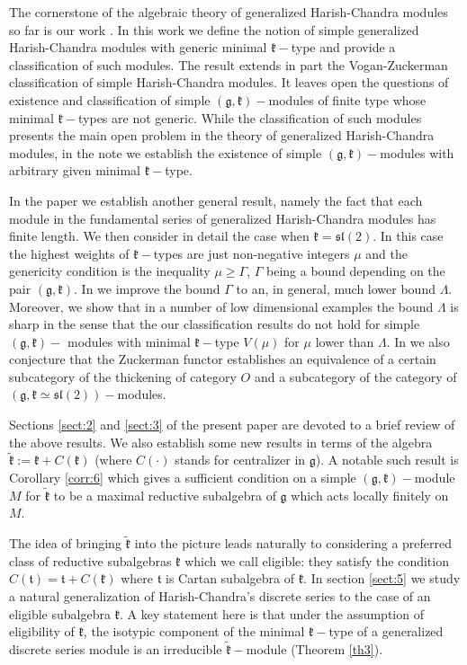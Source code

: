 \documentclass[10pt]{amsart}
\renewcommand{\gg}{\mathfrak{g}}
\newcommand{\kk}{\mathfrak{k}}
\renewcommand{\tt}{\mathfrak{t}}
\renewcommand{\sl}{\mathfrak{sl}}
\begin{document}
The cornerstone of the algebraic theory of generalized Harish-Chandra modules so far is our work \cite{PZ2}. In this work we define the notion of simple generalized Harish-Chandra modules with generic minimal $\kk-$type and provide a classification of such modules. The result extends in part the Vogan-Zuckerman classification of simple Harish-Chandra modules. It leaves open the questions of existence and classification of simple $(\gg,\kk)-$modules of finite type whose minimal $\kk-$types are not generic. While the classification of such modules presents the main open problem in the theory of generalized Harish-Chandra modules, in the note \cite{PZ3} we establish the existence of simple $(\gg,\kk)-$modules with arbitrary given minimal $\kk-$type.

In the paper \cite{PZ5} we establish another general result, namely the fact that each module in the fundamental series of generalized Harish-Chandra modules has finite length. We then consider in detail the case when $\kk=\sl(2)$. In this case the highest weights of $\kk-$types are just non-negative integers $\mu$ and the genericity condition is the inequality $\mu \geq \Gamma$, $\Gamma$ being a bound depending on the pair $(\gg,\kk)$. In \cite{PZ5} we improve the bound $\Gamma$ to an, in general, much lower bound $\Lambda$. Moreover, we show that in a number of low dimensional examples the bound $\Lambda$ is sharp in the sense that the our classification results do not hold for simple $(\gg,\kk)-$ modules with minimal $\kk-$type $V(\mu)$ for $\mu$ lower than $\Lambda$. In \cite{PZ5} we also conjecture that the Zuckerman functor establishes an equivalence of a certain subcategory of the thickening of category $O$ and a subcategory of the category of $(\gg,\kk \simeq \sl(2))-$modules. 

Sections \ref{sect:2} and \ref{sect:3} of the present paper are devoted to a brief review of the above results. We also establish some new results in terms of the algebra $\tilde{\kk} := \kk+C(\kk)$ (where $C(\cdot)$ stands for centralizer in $\gg$). A notable such result is Corollary \ref{corr:6} which gives a sufficient condition on a simple $(\gg,\kk)-$module $M$ for $\tilde{\kk}$ to be a maximal reductive subalgebra of $\gg$ which acts locally finitely on $M$. 

The idea of bringing $\tilde{\kk}$ into the picture leads naturally to considering a preferred class of reductive subalgebras $\kk$ which we call eligible: they satisfy the condition $C(\tt) = \tt+C(\kk)$ where $\tt$ is Cartan subalgebra of $\kk$. In section \ref{sect:5} we study a natural generalization of Harish-Chandra's discrete series to the case of an eligible subalgebra $\kk$. A key statement here is that under the assumption of eligibility of $\kk$, the isotypic component of the minimal $\kk-$type of a generalized discrete series module is an irreducible $\tilde{\kk}-$module (Theorem \ref{th3}).
 
\end{document}
